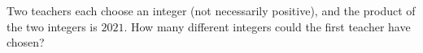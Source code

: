 Two teachers each choose an integer (not necessarily positive), and the product of the two integers is $2021$. How many different integers could the first teacher have chosen?
